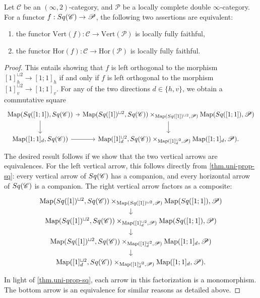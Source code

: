 \documentclass[a4paper, 11pt]{amsart}
\numberwithin{theorem}{section}
\theoremstyle{definition}
\newcommand{\cat}[1]{\textup{#1}}
\newcommand{\map}{\mathrm{Map}}
\newcommand{\C}{\mathscr{C}}
\renewcommand{\P}{\mathscr{P}}
\renewcommand{\Vert}{\mathrm{Vert}}
\newcommand{\Hor}{\mathrm{Hor}}
\newcommand{\Sq}{\cat{Sq}}
\begin{document}
\begin{proposition}\label{prop.sq-ext-lff}
	Let $\C$ be an $(\infty,2)$-category, and $\P$ be a locally complete 
	double $\infty$-category. For a functor $f : \Sq(\C) \rightarrow \P$, the following two assertions are equivalent:
	\begin{enumerate}
		\item the functor $\Vert(f) : \C \to \Vert(\P)$ is locally fully faithful,
		\item the functor $\Hor(f) : \C \to \Hor(\P)$ is locally fully faithful.
	\end{enumerate}
\end{proposition}
\begin{proof}
	This entails showing that
	$f$ is left orthogonal to the morphism $[1]_h^{\sqcup 2} \rightarrow [1;1]_h$ if and only if 
	$f$ is left orthogonal to the morphism $[1]_v^{\sqcup 2} \rightarrow [1;1]_v$. For any of the two directions 
	$d \in \{h,v\}$, we obtain a commutative square
	\[
		\begin{tikzcd}[column sep = tiny]
			\map(\Sq([1;1]), \Sq(\C))\arrow[d] \arrow[r] &  \map(\Sq([1])^{\sqcup 2}, \Sq(\C)) \times_{\map(\Sq([1])^{\sqcup 2}, \P)} \map(\Sq([1;1]), \P)  \arrow[d]\\
			\map([1;1]_d, \Sq(\C)) \arrow[r] &  \map([1]_d^{\sqcup 2}, \Sq(\C)) \times_{\map([1]_d^{\sqcup 2}, \P)} \map([1;1]_d, \P).
		\end{tikzcd}
	\]
	The desired result follows if we show that the two vertical arrows are equivalences. For the left vertical arrow, this follows directly from 
	\cref{thm.uni-prop-sq}: every vertical arrow of $\Sq(\C)$ has a companion, and every horizontal arrow of $\Sq(\C)$ is a companion. The right vertical arrow factors as a composite:
	\[
		\begin{tikzcd}[row sep = small]
		\map(\Sq([1])^{\sqcup 2}, \Sq(\C)) \times_{\map(\Sq([1])^{\sqcup 2}, \P)} \map(\Sq([1;1]), \P) \arrow[d] \\ 
		\map(\Sq([1])^{\sqcup 2}, \Sq(\C)) \times_{\map([1]_d^{\sqcup 2}, \P)} \map(\Sq([1;1]), \P) \arrow[d] \\
		\map(\Sq([1])^{\sqcup 2}, \Sq(\C)) \times_{\map([1]_d^{\sqcup 2}, \P)} \map([1;1]_d, \P) \arrow[d] \\
		\map([1]_d^{\sqcup 2}, \Sq(\C)) \times_{\map([1]_d^{\sqcup 2}, \P)} \map([1;1]_d, \P).
		\end{tikzcd}
	\]
	In light of \cref{thm.uni-prop-sq}, each arrow in this factorization is a monomorphism. The bottom arrow is an equivalence for similar reasons as detailed above.

\end{proof}
\end{document}
